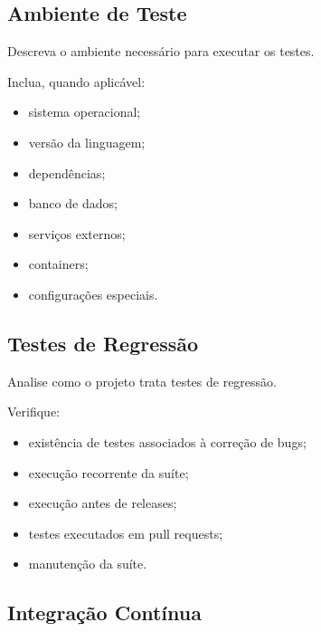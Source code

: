 \subsection{Ambiente de Teste}

Descreva o ambiente necessário para executar os testes.

Inclua, quando aplicável:

\begin{itemize}
    \item sistema operacional;
    \item versão da linguagem;
    \item dependências;
    \item banco de dados;
    \item serviços externos;
    \item containers;
    \item configurações especiais.
\end{itemize}




\subsection{Testes de Regressão}

Analise como o projeto trata testes de regressão.

Verifique:

\begin{itemize}
    \item existência de testes associados à correção de bugs;
    \item execução recorrente da suíte;
    \item execução antes de releases;
    \item testes executados em pull requests;
    \item manutenção da suíte.
\end{itemize}



\subsection{Integração Contínua}

